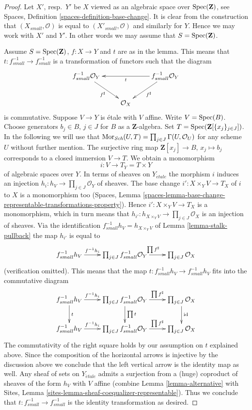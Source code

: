 \begin{proof}
Let $X'$, resp.\ $Y'$ be $X$ viewed as an algebraic space over
$\mathop{\rm Spec}(\mathbf{Z})$, see
Spaces, Definition \ref{spaces-definition-base-change}.
It is clear from the construction that $(X_{small}, \mathcal{O})$
is equal to $(X'_{small}, \mathcal{O})$ and similarly for $Y$.
Hence we may work with $X'$ and $Y'$. In other words we may
assume that $S = \mathop{\rm Spec}(\mathbf{Z})$.

\medskip\noindent
Assume $S = \mathop{\rm Spec}(\mathbf{Z})$, $f : X \to Y$ and $t$ are as in
the lemma. This means that $t : f^{-1}_{small} \to f^{-1}_{small}$
is a transformation of functors such that the diagram
$$
\xymatrix{
f_{small}^{-1}\mathcal{O}_Y
\ar[rd]_{f^\sharp}  & &
f_{small}^{-1}\mathcal{O}_Y \ar[ll]^t \ar[ld]^{f^\sharp} \\
& \mathcal{O}_X
}
$$
is commutative. Suppose $V \to Y$ is \'etale with $V$ affine.
Write $V = \mathop{\rm Spec}(B)$. Choose generators $b_j \in B$, $j \in J$
for $B$ as a $\mathbf{Z}$-algebra. Set
$T = \mathop{\rm Spec}(\mathbf{Z}[\{x_j\}_{j \in J}])$.
In the following we will use that
$\mathop{\rm Mor}\nolimits_{\textit{Sch}}(U, T) = \prod_{j \in J} \Gamma(U, \mathcal{O}_U)$
for any scheme $U$ without further mention.
The surjective ring map $\mathbf{Z}[x_j] \to B$, $x_j \mapsto b_j$
corresponds to a closed immersion $V \to T$.
We obtain a monomorphism
$$
i : V \longrightarrow T_Y = T \times Y
$$
of algebraic spaces over $Y$. In terms of sheaves on $Y_{\acute{e}tale}$
the morphism $i$ induces an injection
$h_i : h_V \to \prod_{j \in J} \mathcal{O}_Y$ of sheaves.
The base change $i' : X \times_Y V \to T_X$ of $i$ to $X$
is a monomorphism too
(Spaces,
Lemma \ref{spaces-lemma-base-change-representable-transformations-property}).
Hence $i' : X \times_Y V \to T_X$ is a monomorphism, which
in turn means that
$h_{i'} : h_{X \times_Y V} \to \prod_{j \in J} \mathcal{O}_X$
is an injection of sheaves.
Via the identification $f_{small}^{-1}h_V = h_{X \times_Y V}$ of
Lemma \ref{lemma-stalk-pullback}
the map $h_{i'}$ is equal to
$$
\xymatrix{
f_{small}^{-1}h_V \ar[r]^-{f^{-1}h_i} &
\prod_{j \in J} f_{small}^{-1}\mathcal{O}_Y
\ar[r]^{\prod f^\sharp} &
\prod_{j \in J} \mathcal{O}_X
}
$$
(verification omitted). This means that the map
$t : f_{small}^{-1}h_V \to f_{small}^{-1}h_V$
fits into the commutative diagram
$$
\xymatrix{
f_{small}^{-1}h_V \ar[r]^-{f^{-1}h_i} \ar[d]^t &
\prod_{j \in J} f_{small}^{-1}\mathcal{O}_Y
\ar[r]^-{\prod f^\sharp} \ar[d]^{\prod t} &
\prod_{j \in J} \mathcal{O}_X \ar[d]^{\text{id}}\\
f_{small}^{-1}h_V \ar[r]^-{f^{-1}h_i} &
\prod_{j \in J} f_{small}^{-1}\mathcal{O}_Y
\ar[r]^-{\prod f^\sharp} &
\prod_{j \in J} \mathcal{O}_X
}
$$
The commutativity of the right square holds by our assumption on $t$
explained above.
Since the composition of the horizontal arrows is injective
by the discussion above we conclude that the left vertical arrow
is the identity map as well. Any sheaf of sets on
$Y_{\acute{e}tale}$ admits a surjection from a (huge) coproduct of sheaves
of the form $h_V$ with $V$ affine (combine
Lemma \ref{lemma-alternative}
with
Sites, Lemma \ref{sites-lemma-sheaf-coequalizer-representable}).
Thus we conclude that $t : f_{small}^{-1} \to f_{small}^{-1}$
is the identity transformation as desired.
\end{proof}

